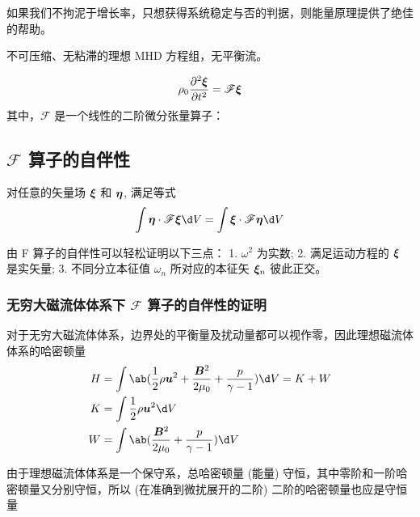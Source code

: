 如果我们不拘泥于增长率，只想获得系统稳定与否的判据，则能量原理提供了绝佳的帮助。

不可压缩、无粘滞的理想 MHD 方程组，无平衡流。

\begin{equation}
\rho_0 \frac{\partial^2 {\bm{\xi}}}{\partial {t}^2} = \mathscr{F} \bm{\xi}
\end{equation}
其中，$\mathscr{F}$ 是一个线性的二阶微分张量算子：

\subsection{\texorpdfstring{$\mathscr{F}$}{F} 算子的自伴性}

对任意的矢量场 $\bm{\xi}$ 和 $\bm{\eta}$, 满足等式
\begin{equation}
\int \vector{\eta} \cdot \mathscr{F} \vector{\xi} \d V
= \int \vector{\xi} \cdot \mathscr{F} \vector{\eta} \d V
\end{equation}

由 F 算子的自伴性可以轻松证明以下三点：
1. $\omega^2$ 为实数;
2. 满足运动方程的 $\bm{\xi}$ 是实矢量;
3. 不同分立本征值 $\omega_n$ 所对应的本征矢 $\bm{\xi}_n$ 彼此正交。

\subsubsection{无穷大磁流体体系下 \texorpdfstring{$\mathscr{F}$}{F} 算子的自伴性的证明}

对于无穷大磁流体体系，边界处的平衡量及扰动量都可以视作零，因此理想磁流体体系的哈密顿量
\begin{subequations}\begin{align}
H &= \int \ab(
    \frac12 \rho \vector{u}^2
    + \frac{\vector{B}^2}{2\mu_0}
    + \frac{p}{\gamma - 1}
) \d V
= K + W \\
K &= \int \frac12 \rho \vector{u}^2 \d V \\
W &= \int \ab(
    \frac{\vector{B}^2}{2\mu_0}
    + \frac{p}{\gamma - 1}
) \d V
\end{align}\end{subequations}

由于理想磁流体体系是一个保守系，总哈密顿量 (能量) 守恒，其中零阶和一阶哈密顿量又分别守恒，所以 (在准确到微扰展开的二阶) 二阶的哈密顿量也应是守恒量

